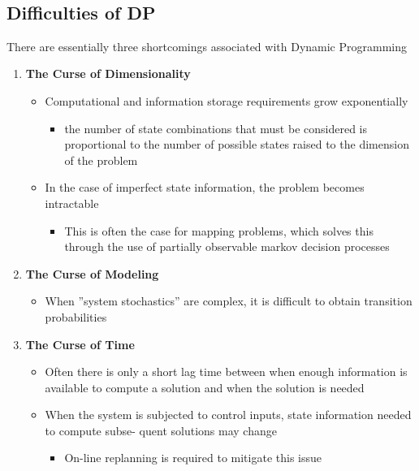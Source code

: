 \documentclass[twoside]{article}
\begin{document}
\\ \subsection{Difficulties of DP}
There are essentially three shortcomings associated with Dynamic Programming \\
\begin{enumerate}
    \item \textbf{The Curse of Dimensionality}
    \begin{itemize}
        \item Computational and information storage requirements grow exponentially
        \begin{itemize}
            \item the number of state combinations that must be considered is proportional to the number of possible states raised to the dimension of the problem
        \end{itemize}
        \item In the case of imperfect state information, the problem becomes intractable
        \begin{itemize}
            \item This is often the case for mapping problems, which solves this through the use of partially observable markov decision processes
        \end{itemize}
    \end{itemize}
    \item \textbf{The Curse of Modeling}
    \begin{itemize}
        \item When ”system stochastics” are complex, it is difficult to obtain transition probabilities
    \end{itemize}
    \item \textbf{The Curse of Time}
    \begin{itemize}
        \item Often there is only a short lag time between when enough information is available to compute a solution and when the solution is needed
        \item When the system is subjected to control inputs, state information needed to compute subse- quent solutions may change
        \begin{itemize}
            \item  On-line replanning is required to mitigate this issue
        \end{itemize}
    \end{itemize}
\end{enumerate}
\end{document}
